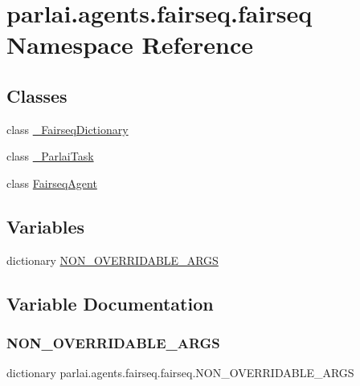 \hypertarget{namespaceparlai_1_1agents_1_1fairseq_1_1fairseq}{}\section{parlai.\+agents.\+fairseq.\+fairseq Namespace Reference}
\label{namespaceparlai_1_1agents_1_1fairseq_1_1fairseq}
\subsection*{Classes}
\begin{DoxyCompactItemize}
\item 
class \hyperlink{classparlai_1_1agents_1_1fairseq_1_1fairseq_1_1__FairseqDictionary}{\+\_\+\+Fairseq\+Dictionary}
\item 
class \hyperlink{classparlai_1_1agents_1_1fairseq_1_1fairseq_1_1__ParlaiTask}{\+\_\+\+Parlai\+Task}
\item 
class \hyperlink{classparlai_1_1agents_1_1fairseq_1_1fairseq_1_1FairseqAgent}{Fairseq\+Agent}
\end{DoxyCompactItemize}
\subsection*{Variables}
\begin{DoxyCompactItemize}
\item 
dictionary \hyperlink{namespaceparlai_1_1agents_1_1fairseq_1_1fairseq_a2158d73b9a4d75375ee6931d0450c79f}{N\+O\+N\+\_\+\+O\+V\+E\+R\+R\+I\+D\+A\+B\+L\+E\+\_\+\+A\+R\+GS}
\end{DoxyCompactItemize}


\subsection{Variable Documentation}
\mbox{\label{namespaceparlai_1_1agents_1_1fairseq_1_1fairseq_a2158d73b9a4d75375ee6931d0450c79f}} 
\subsubsection{\texorpdfstring{N\+O\+N\+\_\+\+O\+V\+E\+R\+R\+I\+D\+A\+B\+L\+E\+\_\+\+A\+R\+GS}{NON\_OVERRIDABLE\_ARGS}}
{\footnotesize\ttfamily dictionary parlai.\+agents.\+fairseq.\+fairseq.\+N\+O\+N\+\_\+\+O\+V\+E\+R\+R\+I\+D\+A\+B\+L\+E\+\_\+\+A\+R\+GS}

